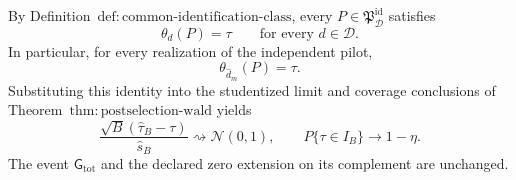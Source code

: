 By Definition~\(\mathrm{def{:}common\text{-}identification\text{-}class}\), every \(P\in\mathfrak P_{\mathcal D}^{\mathrm{id}}\) satisfies
\[
 \theta_d(P)=\tau\qquad\text{for every }d\in\mathcal D.
\]
In particular, for every realization of the independent pilot,
\[
 \theta_{\widehat d_m}(P)=\tau.
\]
Substituting this identity into the studentized limit and coverage conclusions of Theorem~\(\mathrm{thm{:}postselection\text{-}wald}\) yields
\[
 \frac{\sqrt B(\widehat\tau_B-\tau)}{\widehat s_B}
 \rightsquigarrow\mathcal N(0,1),
 \qquad
 P\{\tau\in I_B\}\longrightarrow1-\eta.
\]
The event \(\mathsf G_{\mathrm{tot}}\) and the declared zero extension on its complement are unchanged.